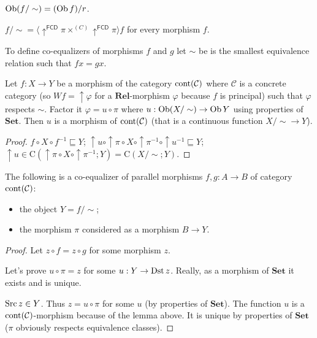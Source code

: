 \begin{obvious}
$\operatorname{Ob} (f / \sim) = (\operatorname{Ob} f) / r$.
\end{obvious}

\begin{obvious}
$f / \sim = \langle \uparrow^{\mathsf{FCD}} \pi \times^{(C)}
\uparrow^{\mathsf{FCD}} \pi \rangle f$ for every morphism
$f$.
\end{obvious}

To define co-equalizers of morphisms $f$ and $g$ let $\sim$ be is the smallest
equivalence relation such that $f x = g x$.

\begin{lem}
  Let $f : X \rightarrow Y$ be a morphism of the category
  $\operatorname{cont} (\mathcal{C})$ where $\mathcal{C}$ is a concrete
  category (so $W f = \uparrow \varphi$ for a $\mathbf{Rel}$-morphism
  $\varphi$ because $f$ is principal) such that $\varphi$ respects $\sim$.
  Factor it $\varphi = u \circ \pi$ where $u : \operatorname{Ob} (X / \sim)
  \rightarrow \operatorname{Ob} Y$ using properties of $\mathbf{Set}$. Then
  $u$ is a morphism of $\operatorname{cont} (\mathcal{C})$ (that is a
  continuous function $X / \sim \rightarrow Y$).
\end{lem}

\begin{proof}
  $f \circ X \circ f^{- 1} \sqsubseteq Y$; $\uparrow u \circ \uparrow \pi
  \circ X \circ \uparrow \pi^{- 1} \circ \uparrow u^{- 1} \sqsubseteq Y$;
  $\uparrow u \in \mathrm{C} (\uparrow \pi \circ X \circ \uparrow \pi^{- 1} ;
  Y) = \mathrm{C} (X / \sim ; Y)$.
\end{proof}

\begin{thm}
  The following is a co-equalizer of parallel morphisms $f, g : A \rightarrow
  B$ of category $\operatorname{cont} (\mathcal{C})$:
  \begin{itemize}
    \item the object $Y = f / \sim$;
    
    \item the morphism $\pi$ considered as a morphism $B \rightarrow Y$.
  \end{itemize}
\end{thm}

\begin{proof}
  Let $z \circ f = z \circ g$ for some morphism $z$.
  
  Let's prove $u \circ \pi = z$ for some $u : Y \rightarrow \operatorname{Dst} z$.
  Really, as a morphism of $\mathbf{Set}$ it exists and is unique.
  
  $\operatorname{Src} z \in Y$. Thus $z = u \circ \pi$ for some $u$ (by properties of
  $\mathbf{Set}$). The function $u$ is a $\operatorname{cont}
  (\mathcal{C})$-morphism because of the lemma above. It is unique by
  properties of $\mathbf{Set}$ ($\pi$ obviously respects equivalence
  classes).
\end{proof}


